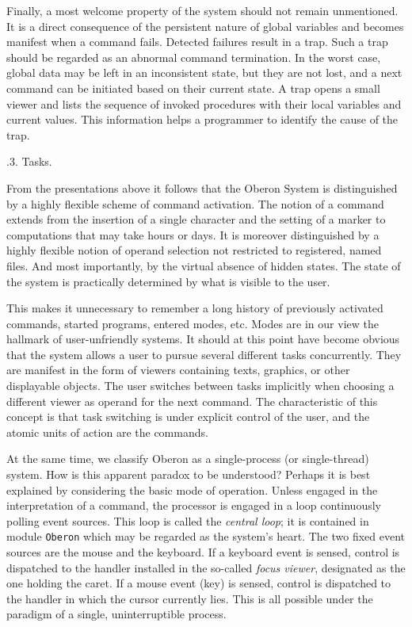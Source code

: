 Finally, a most welcome property of the system should not remain
unmentioned. It is a direct consequence of the persistent nature of
global variables and becomes manifest when a command fails. Detected
failures result in a trap. Such a trap should be regarded as an
abnormal command termination. In the worst case, global data may be
left in an inconsistent state, but they are not lost, and a next
command can be initiated based on their current state. A trap opens a
small viewer and lists the sequence of invoked procedures with their
local variables and current values. This information helps a
programmer to identify the cause of the trap.

.3. Tasks.

From the presentations above it follows that the Oberon System is
distinguished by a highly flexible scheme of command activation. The
notion of a command extends from the insertion of a single character
and the setting of a marker to computations that may take hours or
days. It is moreover distinguished by a highly flexible notion of
operand selection not restricted to registered, named files. And most
importantly, by the virtual absence of hidden states. The state of the
system is practically determined by what is visible to the user.

This makes it unnecessary to remember a long history of previously
activated commands, started programs, entered modes, etc. Modes are in
our view the hallmark of user-unfriendly systems. It should at this
point have become obvious that the system allows a user to pursue
several different tasks concurrently. They are manifest in the form of
viewers containing texts, graphics, or other displayable objects. The
user switches between tasks implicitly when choosing a different
viewer as operand for the next command. The characteristic of this
concept is that task switching is under explicit control of the user,
and the atomic units of action are the commands.

At the same time, we classify Oberon as a single-process (or
single-thread) system. How is this apparent paradox to be understood?
Perhaps it is best explained by considering the basic mode of
operation. Unless engaged in the interpretation of a command, the
processor is engaged in a loop continuously polling event
sources. This loop is called the {\it central loop\/}; it is contained in
module {\tt Oberon} which may be regarded as the system's heart. The two
fixed event sources are the mouse and the keyboard. If a keyboard
event is sensed, control is dispatched to the handler installed in the
so-called {\it focus viewer\/}, designated as the one holding the caret. If a
mouse event (key) is sensed, control is dispatched to the handler in
which the cursor currently lies. This is all possible under the
paradigm of a single, uninterruptible process.

